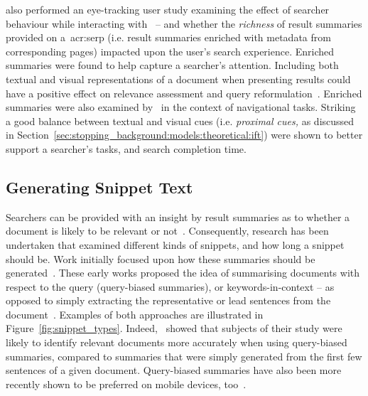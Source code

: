 \cite{marcos2015snippets_web_search} also performed an eye-tracking user study examining the effect of searcher behaviour while interacting with~ -- and whether the \emph{richness} of result summaries provided on a~\gls{acr:serp} (i.e. result summaries enriched with metadata from corresponding pages) impacted upon the user's search experience. Enriched summaries were found to help capture a searcher's attention. Including both textual and visual representations of a document when presenting results could have a positive effect on relevance assessment and query reformulation~\citep{joho2006presentation}. Enriched summaries were also examined by~\cite{ali2009interaction_interfaces} in the context of navigational tasks. Striking a good balance between textual and visual cues (i.e. \emph{proximal cues,} as discussed in Section~\ref{sec:stopping_background:models:theoretical:ift}) were shown to better support a searcher's tasks, and search completion time.

\subsection{Generating Snippet Text}
Searchers can be provided with an insight by result summaries as to whether a document is likely to be relevant or not~\cite{he2012bridging}. Consequently, research has been undertaken that examined different kinds of snippets, and how long a snippet should be. Work initially focused upon how these summaries should be generated~\citep{pedersen1991snippet, landauer1993enhancing, tombros1998query_biased, white2003task, leal2015query}. These early works proposed the idea of summarising documents with respect to the query (query-biased summaries), or keywords-in-context -- as opposed to simply extracting the representative or lead sentences from the document~\citep{kupiec1995tds}. Examples of both approaches are illustrated in Figure~\ref{fig:snippet_types}. Indeed,~\cite{tombros1998query_biased} showed that subjects of their study were likely to identify relevant documents more accurately when using query-biased summaries, compared to summaries that were simply generated from the first few sentences of a given document. Query-biased summaries have also been more recently shown to be preferred on mobile devices, too~\citep{spirin2016snippets}.

